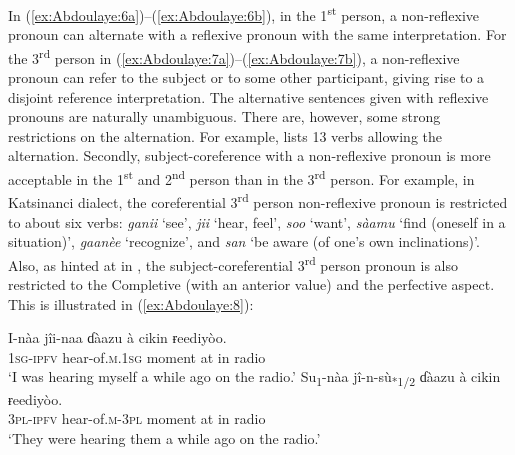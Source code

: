\documentclass[output=paper]{langscibook}
\begin{document}
In (\ref{ex:Abdoulaye:6a})--(\ref{ex:Abdoulaye:6b}), in the 1\textsuperscript{st} person, a non-reflexive pronoun can alternate with a reflexive pronoun with the same interpretation. For the 3\textsuperscript{rd} person in (\ref{ex:Abdoulaye:7a})--(\ref{ex:Abdoulaye:7b}), a non-reflexive pronoun can refer to the subject or to some other participant, giving rise to a disjoint reference interpretation. The alternative sentences given with reflexive pronouns are naturally unambiguous. There are, however, some strong restrictions on the alternation. For example, \citet[524]{Newman2000} lists 13 verbs allowing the alternation. Secondly, subject-coreference with a non-reflexive pronoun is more acceptable in the 1\textsuperscript{st} and 2\textsuperscript{nd} person than in the 3\textsuperscript{rd} person. For example, in Katsinanci dialect, the coreferential 3\textsuperscript{rd} person non-reflexive pronoun is restricted to about six verbs: \textit{ganii} ‘see’, \textit{jii} ‘hear, feel’, \textit{soo} ‘want’, \textit{sàamu} ‘find (oneself in a situation)’, \textit{gaanèe} ‘recognize’, and \textit{san} ‘be aware (of one’s own inclinations)’. Also, as hinted at in \citet[524]{Newman2000}, the subject-coreferential 3\textsuperscript{rd} person pronoun is also restricted to the Completive (with an anterior value) and the perfective aspect. This is illustrated in (\ref{ex:Abdoulaye:8}): 


\ea%
    \label{ex:Abdoulaye:8}
    \ea  \label{ex:Abdoulaye:8a}
    \gll I-nàa  jîi-naa  ɗàazu  à  cikin  ɍeediyòo.\\
    \textsc{1sg-ipfv}  hear-of.\textsc{m.1sg}  moment  at  in  radio\\
    \glt `I was hearing myself a while ago on the radio.’
    \ex \label{ex:Abdoulaye:8b}
    \gll Su\textsubscript{1}{}-nàa  jî-n-sù\textsubscript{*1/2}  ɗàazu  à  cikin  ɍeediyòo.\\
    \textsc{3pl-ipfv}  hear-of.\textsc{m-3pl}  moment  at  in  radio\\
    \glt `They were hearing them a while ago on the radio.’
    \z
\z 
\end{document}
